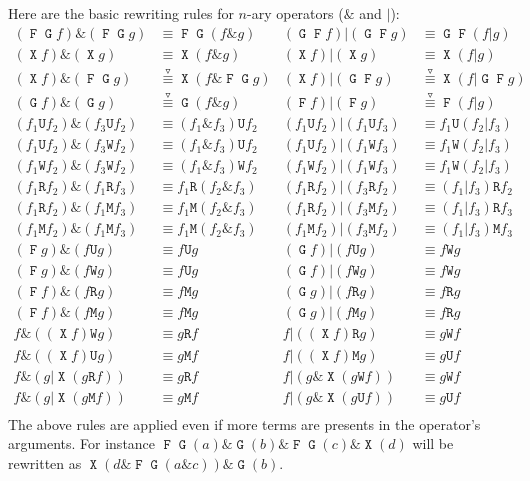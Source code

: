 \documentclass[a4paper,twoside,10pt,DIV=12]{scrreprt}
\DeclareMathOperator{\F}{\texttt{F}}
\DeclareMathOperator{\G}{\texttt{G}}
\newcommand{\U}{\mathbin{\texttt{U}}}
\newcommand{\R}{\mathbin{\texttt{R}}}
\DeclareMathOperator{\X}{\texttt{X}}
\newcommand{\M}{\mathbin{\texttt{M}}}
\newcommand{\W}{\mathbin{\texttt{W}}}
\newcommand{\OR}{\mathbin{\texttt{|}}}
\newcommand{\AND}{\mathbin{\texttt{\&}}}
\newcommand{\0}{\texttt{0}}
\newcommand{\1}{\texttt{1}}
\newcommand{\equivNeu}{\stackrel{\smalltriangledown}{\equiv}}
\begin{document}
Here are the basic rewriting rules for $n$-ary operators ($\AND$ and
$\OR$):
\begin{align*}
  (\F\G f) \AND(\F\G g) &\equiv \F\G(f\AND g)     &
  (\G\F f) \OR (\G\F g) &\equiv \G\F(f\OR g)      \\
  (\X f) \AND(\X g)     &\equiv \X(f\AND g)       &
  (\X f) \OR (\X g)     &\equiv \X(f\OR g)        \\
  (\X f) \AND(\F\G g)   &\equivNeu \X(f\AND \F\G g)  &
  (\X f) \OR (\G\F g)   &\equivNeu \X(f\OR \G\F g)  \\
  (\G f) \AND(\G g)     &\equivNeu \G(f\AND g)       &
  (\F f) \OR (\F g)     &\equivNeu \F(f\OR g)        \\
  (f_1 \U f_2)\AND (f_3 \U f_2)&\equiv (f_1\AND f_3)\U f_2&
  (f_1 \U f_2)\OR  (f_1 \U f_3)&\equiv f_1\U (f_2\OR f_3) \\
  (f_1 \U f_2)\AND (f_3 \W f_2)&\equiv (f_1\AND f_3)\U f_2&
  (f_1 \U f_2)\OR  (f_1 \W f_3)&\equiv f_1\W (f_2\OR f_3) \\
  (f_1 \W f_2)\AND (f_3 \W f_2)&\equiv (f_1\AND f_3)\W f_2&
  (f_1 \W f_2)\OR  (f_1 \W f_3)&\equiv f_1\W (f_2\OR f_3) \\
  (f_1 \R f_2)\AND (f_1 \R f_3)&\equiv f_1\R (f_2\AND f_3)&
  (f_1 \R f_2)\OR  (f_3 \R f_2)&\equiv (f_1\OR f_3) \R f_2\\
  (f_1 \R f_2)\AND (f_1 \M f_3)&\equiv f_1\M (f_2\AND f_3)&
  (f_1 \R f_2)\OR  (f_3 \M f_2)&\equiv (f_1\OR f_3) \R f_3\\
  (f_1 \M f_2)\AND (f_1 \M f_3)&\equiv f_1\M (f_2\AND f_3)&
  (f_1 \M f_2)\OR  (f_3 \M f_2)&\equiv (f_1\OR f_3) \M f_3\\
  (\F g)\AND (f \U g)&\equiv f\U g &
  (\G f)\OR  (f \U g)&\equiv f\W g \\
  (\F g)\AND (f \W g)&\equiv f\U g &
  (\G f)\OR  (f \W g)&\equiv f\W g \\
  (\F f)\AND (f \R g)&\equiv f\M g &
  (\G g)\OR  (f \R g)&\equiv f\R g \\
  (\F f)\AND (f \M g)&\equiv f\M g &
  (\G g)\OR  (f \M g)&\equiv f\R g \\
  f \AND ((\X f) \W g) &\equiv g \R f &
  f \OR ((\X f) \R g) &\equiv g \W f \\
  f \AND ((\X f) \U g) &\equiv g \M f &
  f \OR ((\X f) \M g) &\equiv g \U f \\
  f \AND (g \OR \X(g \R f)) &\equiv g \R f &
  f \OR (g \AND \X(g \W f)) &\equiv g \W f \\
  f \AND (g \OR \X(g \M f)) &\equiv g \M f &
  f \OR (g \AND \X(g \U f)) &\equiv g \U f \\
\end{align*}
The above rules are applied even if more terms are presents in the
operator's arguments.  For instance $\F\G(a)\AND \G(b) \AND \F\G(c) \AND
\X(d)$ will be rewritten as $\X(d \AND \F\G(a\AND c))\AND \G(b)$.
\end{document}
